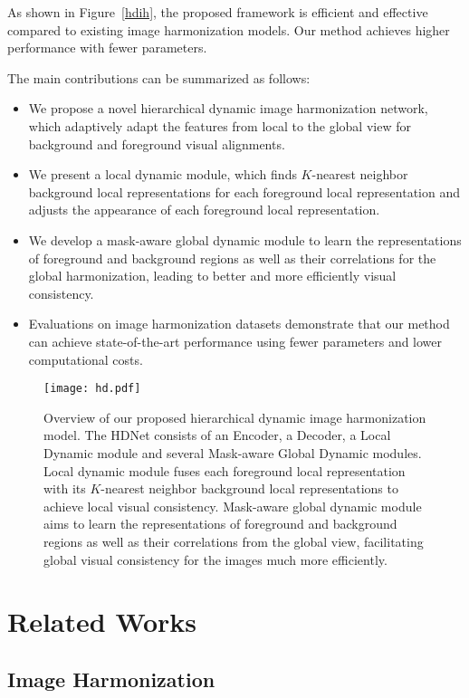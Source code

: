 \documentclass[sigconf]{acmart}
\begin{document}
As shown in Figure~\ref{hdih}, the proposed framework is efficient and effective compared to existing image harmonization models. Our method achieves higher performance with fewer parameters.

The main contributions can be summarized as follows:
\begin{itemize}
	\item We propose a novel hierarchical dynamic image harmonization network, which adaptively adapt the features from local to the global view for background and foreground visual alignments. 
	
	\item We present a local dynamic module, which finds $K$-nearest neighbor background local representations for each foreground local representation and adjusts the appearance of each foreground local representation.
	
	\item We develop a mask-aware global dynamic module to learn the representations of foreground and background regions as well as their correlations for the global harmonization, leading to better and more efficiently visual consistency.
	
	\item Evaluations on image harmonization datasets demonstrate that our method can achieve state-of-the-art performance using fewer parameters and lower computational costs.
\end{itemize}

\begin{figure*}[t]
	\centering
	\texttt{[image: hd.pdf]}
	\caption{Overview of our proposed hierarchical dynamic image harmonization model. The HDNet consists of an Encoder, a Decoder, a Local Dynamic module and several Mask-aware Global Dynamic modules. Local dynamic module fuses each foreground local representation with its $K$-nearest neighbor background local representations to achieve local visual consistency. Mask-aware global dynamic module aims to learn the representations of foreground and background regions as well as their correlations from the global view, facilitating global visual consistency for the images much more efficiently.}
\end{figure*}


\section{Related Works}
\subsection{Image Harmonization}
\end{document}
